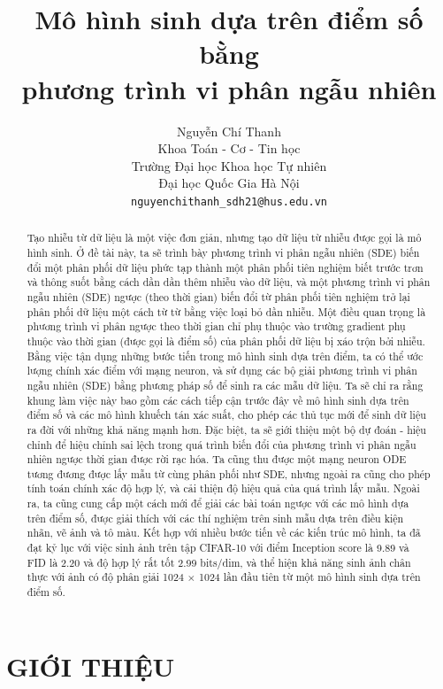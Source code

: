 \documentclass{article} %
\title{Mô hình sinh dựa trên điểm số bằng \\ phương trình vi phân ngẫu nhiên}
\author{Nguyễn Chí Thanh \\
Khoa Toán - Cơ - Tin học\\
Trường Đại học Khoa học Tự nhiên\\
Đại học Quốc Gia Hà Nội \\
\texttt{nguyenchithanh\_sdh21@hus.edu.vn} \\
}
\begin{document}
\maketitle

\begin{abstract}
    Tạo nhiễu từ dữ liệu là một việc đơn giản, nhưng tạo dữ liệu từ nhiễu được gọi là mô hình sinh.
    Ở đề tài này, ta sẽ trình bày phương trình vi phân ngẫu nhiên (SDE) biến đổi một phân phối dữ liệu phức tạp thành một phân phối tiên nghiệm biết trước trơn và thông suốt bằng cách dần dần thêm nhiễu vào dữ liệu,
    và một phương trình vi phân ngẫu nhiên (SDE) ngược (theo thời gian) biến đổi từ phân phối tiên nghiệm trở lại phân phối dữ liệu một cách từ từ bằng việc loại bỏ dần nhiễu.
    Một điều quan trọng là phương trình vi phân ngược theo thời gian chỉ phụ thuộc vào trường gradient phụ thuộc vào thời gian (được gọi là điểm số) của phân phối dữ liệu bị xáo trộn bởi nhiễu.
    Bằng việc tận dụng những bước tiến trong mô hình sinh dựa trên điểm, ta có thể ước lượng chính xác điểm với mạng neuron, và sử dụng các bộ giải phương trình vi phân ngẫu nhiên (SDE) bằng phương pháp số để sinh ra các mẫu dữ liệu.
    Ta sẽ chỉ ra rằng khung làm việc này bao gồm các cách tiếp cận trước đây về mô hình sinh dựa trên điểm số và các mô hình khuếch tán xác suất, cho phép các thủ tục mới để sinh dữ liệu ra đời với những khả năng mạnh hơn.
    Đặc biệt, ta sẽ giới thiệu một bộ dự đoán - hiệu chỉnh để hiệu chỉnh sai lệch trong quá trình biến đổi của phương trình vi phân ngẫu nhiên ngược thời gian được rời rạc hóa.
    Ta cũng thu được một mạng neuron ODE tương đương được lấy mẫu từ cùng phân phối như SDE, nhưng ngoài ra cũng cho phép tính toán chính xác độ hợp lý, và cải thiện độ hiệu quả của quá trình lấy mẫu.
    Ngoài ra, ta cũng cung cấp một cách mới để giải các bài toán ngược với các mô hình dựa trên điểm số, được giải thích với các thí nghiệm trên sinh mẫu dựa trên điều kiện nhãn, vẽ ảnh và tô màu.
    Kết hợp với nhiều bước tiến về các kiến trúc mô hình, ta đã đạt kỷ lục với việc sinh ảnh trên tập CIFAR-10 với điểm Inception score là 9.89 và FID là 2.20 và độ hợp lý rất tốt 2.99 bits/dim, và thể hiện khả năng sinh ảnh chân thực với ảnh có độ phân giải 1024 $\times$ 1024 lần đầu tiên từ một mô hình sinh dựa trên điểm số.
\end{abstract}

\section{GIỚI THIỆU} \label{1}
\end{document}
